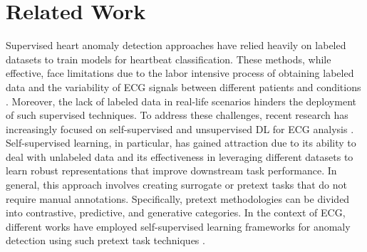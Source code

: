 \section{Related Work}
\label{related}

Supervised heart anomaly detection approaches have relied heavily on labeled datasets to train models for heartbeat classification. These methods, while effective, face limitations due to the labor intensive process of obtaining labeled data and the variability of ECG signals between different patients and conditions \cite{anbalagan_analysis_2023}. Moreover, the lack of labeled data in real-life scenarios hinders the deployment of such supervised techniques. To address these challenges, recent research has increasingly focused on self-supervised and unsupervised DL for ECG analysis \cite{li_contrastive_2021,reviewSSLbiosignals,nezamabadi_unsupervised_2023}. Self-supervised learning, in particular, has gained attraction due to its ability to deal with unlabeled data and its effectiveness in leveraging different datasets to learn robust representations that improve downstream task performance. In general, this approach involves creating surrogate or pretext tasks that do not require manual annotations. Specifically, pretext methodologies can be divided into contrastive, predictive, and generative categories. In the context of ECG, different works have employed self-supervised learning frameworks for anomaly detection using such pretext task techniques \cite{reviewSSLbiosignals}. 

